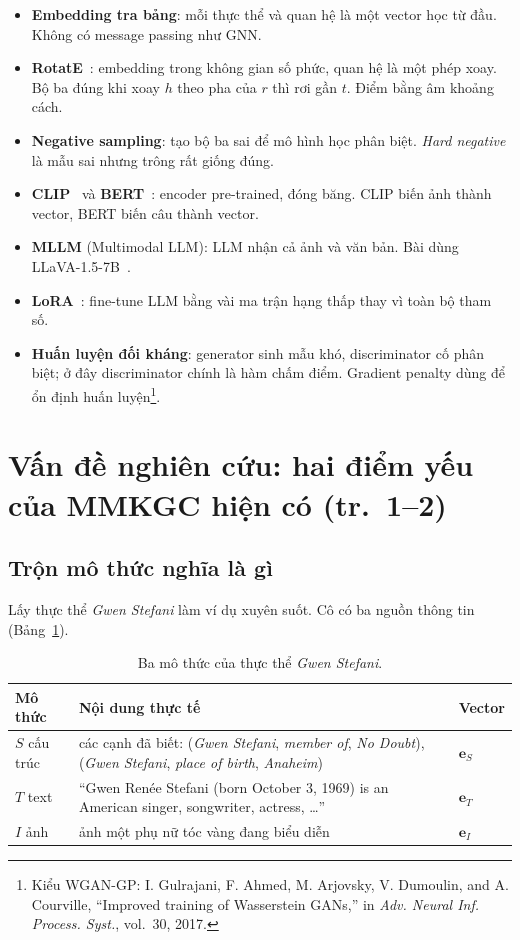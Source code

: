 \documentclass[11pt,a4paper]{article}
\newcommand{\Ent}[1]{\textit{#1}}
\begin{document}
\begin{itemize}
\item \textbf{Embedding tra bảng}: mỗi thực thể và quan hệ là một vector học từ đầu. Không có message passing như GNN.
\item \textbf{RotatE}~\cite{rotate}: embedding trong không gian số phức, quan hệ là một phép xoay. Bộ ba đúng khi xoay $h$ theo pha của $r$ thì rơi gần $t$. Điểm bằng âm khoảng cách.
\item \textbf{Negative sampling}: tạo bộ ba sai để mô hình học phân biệt. \textit{Hard negative} là mẫu sai nhưng trông rất giống đúng.
\item \textbf{CLIP}~\cite{clip} và \textbf{BERT}~\cite{bert}: encoder pre-trained, đóng băng. CLIP biến ảnh thành vector, BERT biến câu thành vector.
\item \textbf{MLLM} (Multimodal LLM): LLM nhận cả ảnh và văn bản. Bài dùng LLaVA-1.5-7B~\cite{llava}.
\item \textbf{LoRA}~\cite{lora}: fine-tune LLM bằng vài ma trận hạng thấp thay vì toàn bộ tham số.
\item \textbf{Huấn luyện đối kháng}: generator sinh mẫu khó, discriminator cố phân biệt; ở đây discriminator chính là hàm chấm điểm. Gradient penalty dùng để ổn định huấn luyện\footnote{Kiểu WGAN-GP: I. Gulrajani, F. Ahmed, M. Arjovsky, V. Dumoulin, and A. Courville, ``Improved training of Wasserstein GANs,'' in \textit{Adv. Neural Inf. Process. Syst.}, vol.~30, 2017.}.
\end{itemize}

\section{Vấn đề nghiên cứu: hai điểm yếu của MMKGC hiện có (tr.~1--2)}

\subsection{Trộn mô thức nghĩa là gì}

Lấy thực thể \Ent{Gwen Stefani} làm ví dụ xuyên suốt. Cô có ba nguồn thông tin (Bảng~\ref{tab:gwen}).

\begin{table}[H]
\centering\small
\caption{Ba mô thức của thực thể \Ent{Gwen Stefani}.}
\label{tab:gwen}
\begin{tabular}{@{}lp{7.5cm}l@{}}
\toprule
Mô thức & Nội dung thực tế & Vector\\
\midrule
$S$ cấu trúc & các cạnh đã biết: (\Ent{Gwen Stefani}, \Ent{member of}, \Ent{No Doubt}), (\Ent{Gwen Stefani}, \Ent{place of birth}, \Ent{Anaheim}) & $\mathbf{e}_S$\\
$T$ text & ``Gwen Renée Stefani (born October 3, 1969) is an American singer, songwriter, actress, \ldots'' & $\mathbf{e}_T$\\
$I$ ảnh & ảnh một phụ nữ tóc vàng đang biểu diễn & $\mathbf{e}_I$\\
\bottomrule
\end{tabular}
\end{table}
\end{document}
